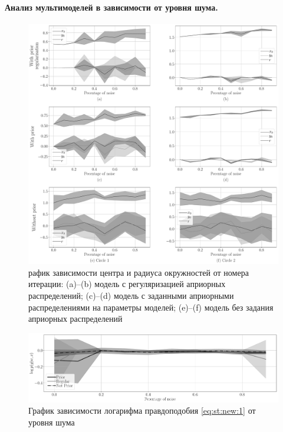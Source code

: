 \paragraph{Анализ мультимоделей в зависимости от уровня шума.} 
\begin{figure}[h!t]\center
\includegraphics[width=1\textwidth]{results/priorexpert/experiment_synthetic_param_progress_noise}
\caption{рафик зависимости центра и радиуса окружностей от номера итерации: (a)--(b) модель с регуляризацией априорных распределений; (c)--(d) модель с заданными априорными распределениями на параметры моделей; (e)--(f) модель без задания априорных распределений}
\label{experiment:st:3:1}
\end{figure}

\begin{figure}[h!t]\center
\includegraphics[width=1\textwidth]{results/priorexpert/experiment_synt_likelihood_progress_noise}
\caption{График зависимости логарифма правдоподобия \eqref{eq:st:new:1} от уровня шума
}
\label{experiment:st:3:2}
\end{figure}

